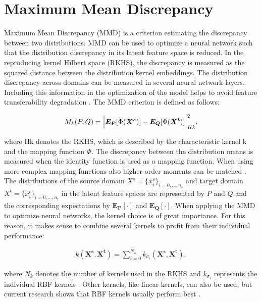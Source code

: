 \section{Maximum Mean Discrepancy}
Maximum Mean Discrepancy (MMD) is a criterion estimating the discrepancy between two distributions. MMD can be used to optimize a neural network such that the distribution discrepancy in its latent feature space is reduced. In the reproducing kernel Hilbert space (RKHS), the discrepancy is measured as the squared distance between the distribution kernel embeddings. The distribution discrepancy across domains can be measured in several neural network layers. Including this information in the optimization of the model helps to avoid feature transferability degradation \cite{li2020}. The MMD criterion is defined as follows:

\begin{align}
    M_{k}(P,Q) = \Bigl|  \boldsymbol{E_{P}}[\Phi(\boldsymbol{X^{s}})] - \boldsymbol{E_{Q}}[\Phi(\boldsymbol{X^{t}})]     \Bigl|^{2}_{Hk},
\end{align}

where Hk denotes the RKHS, which is described by the characteristic kernel k and the mapping function $\Phi$. The discrepancy between the distribution means is measured when the identity function is used as a mapping function. When using more complex mapping functions also higher order moments can be matched \cite{Yujia2015}. The distributions of the source domain $X^{s} = \{{x}_{i}^{s}\}_{i=0,...,n_{s}}$ and target domain $X^{t} = \{{x}_{i}^{t}\}_{i=0,...,n_{t}}$ in the latent feature spaces are represented by $P$ and $Q$ and the corresponding expectations by $\boldsymbol{E_{P}[\cdot]}$ and $\boldsymbol{E_{Q}[\cdot]}$. When applying the MMD to optimize neural networks, the kernel choice is of great importance. For this reason, it makes sense to combine several kernels to profit from their individual performance:

\begin{align}
    k(\boldsymbol{X^{s}}, \boldsymbol{X^{t}}) = \sum_{i=0}^{N_{k}} k_{\sigma_{i}}(\boldsymbol{X^{s}}, \boldsymbol{X^{t}}),
\end{align}

where $N_{k}$ denotes the number of kernels used in the RKHS and $k_{\sigma_{i}}$ represents the individual RBF kernels  \cite{li2020}. Other kernels, like linear kernels, can also be used, but current research shows that RBF kernels usually perform best \cite{AZAMFAR2020103932}.


